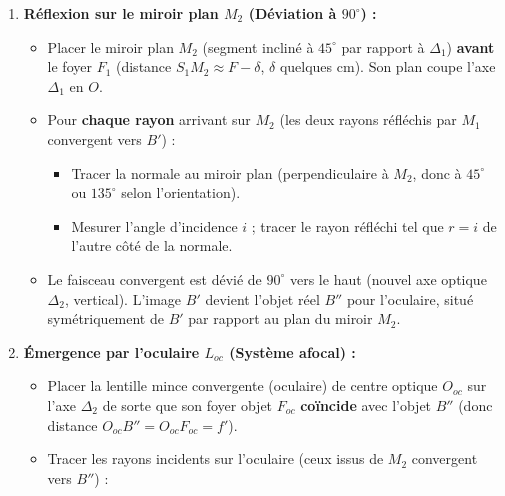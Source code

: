 \documentclass[11pt]{article}
\begin{document}
\begin{methode}
\begin{enumerate}
\begin{itemize}
\begin{itemize}
                \end{itemize}
            \item \textbf{Image $B'$ :} Le point d'intersection des deux rayons réfléchis définit l'image réelle $B'$. \textbf{Vérification :} $B'$ se situe sur le plan focal $\mathcal{P}_{F_1}$. Comme le rayon principal se réfléchit vers le bas (angle $-\theta$), $B'$ est du côté opposé à l'axe par rapport au rayon incident $\rightarrow$ \textbf{image inversée}.
        \end{itemize}
    \item \textbf{Réflexion sur le miroir plan $M_2$ (Déviation à $90^\circ$) :}
        \begin{itemize}
            \item Placer le miroir plan $M_2$ (segment incliné à $45^\circ$ par rapport à $\Delta_1$) \textbf{avant} le foyer $F_1$ (distance $S_1M_2 \approx F - \delta$, $\delta$ quelques cm). Son plan coupe l'axe $\Delta_1$ en $O$.
            \item Pour \textbf{chaque rayon} arrivant sur $M_2$ (les deux rayons réfléchis par $M_1$ convergent vers $B'$) :
                \begin{itemize}
                    \item Tracer la normale au miroir plan (perpendiculaire à $M_2$, donc à $45^\circ$ ou $135^\circ$ selon l'orientation).
                    \item Mesurer l'angle d'incidence $i$ ; tracer le rayon réfléchi tel que $r = i$ de l'autre côté de la normale.
                \end{itemize}
            \item Le faisceau convergent est dévié de \textbf{$90^\circ$} vers le haut (nouvel axe optique $\Delta_2$, vertical). L'image $B'$ devient l'objet réel $B''$ pour l'oculaire, situé symétriquement de $B'$ par rapport au plan du miroir $M_2$.
        \end{itemize}
    \item \textbf{Émergence par l'oculaire $L_{oc}$ (Système afocal) :}
        \begin{itemize}
            \item Placer la lentille mince convergente (oculaire) de centre optique $O_{oc}$ sur l'axe $\Delta_2$ de sorte que son foyer objet $F_{oc}$ \textbf{coïncide} avec l'objet $B''$ (donc distance $O_{oc}B'' = O_{oc}F_{oc} = f'$).
            \item Tracer les rayons incidents sur l'oculaire (ceux issus de $M_2$ convergent vers $B''$) :

\end{itemize}
\end{enumerate}
\end{methode}
\end{document}
